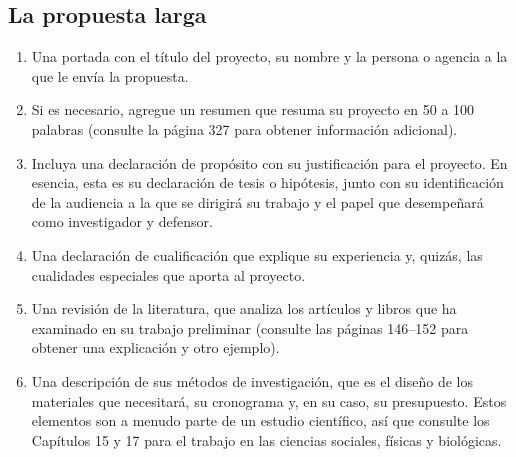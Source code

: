 \subsection{La propuesta larga}
\begin{enumerate}[1.]
    \item Una portada con el título del proyecto, su nombre y la persona o agencia a la que le envía la propuesta.
    \item Si es necesario, agregue un resumen que resuma su proyecto en 50 a 100 palabras (consulte la página 327 para obtener información adicional).
    \item Incluya una declaración de propósito con su justificación para el proyecto. En esencia, esta es su declaración de tesis o hipótesis, junto con su identificación de la audiencia a la que se dirigirá su trabajo y el papel que desempeñará como investigador y defensor.
    \item Una declaración de cualificación que explique su experiencia y, quizás, las cualidades especiales que aporta al proyecto. 
    \item Una revisión de la literatura, que analiza los artículos y libros que ha examinado en su trabajo preliminar (consulte las páginas 146–152 para obtener una explicación y otro ejemplo).
    \item Una descripción de sus métodos de investigación, que es el diseño de los materiales que necesitará, su cronograma y, en su caso, su presupuesto. Estos elementos son a menudo parte de un estudio científico, así que consulte los Capítulos 15 y 17 para el trabajo en las ciencias sociales, físicas y biológicas.
\end{enumerate}

